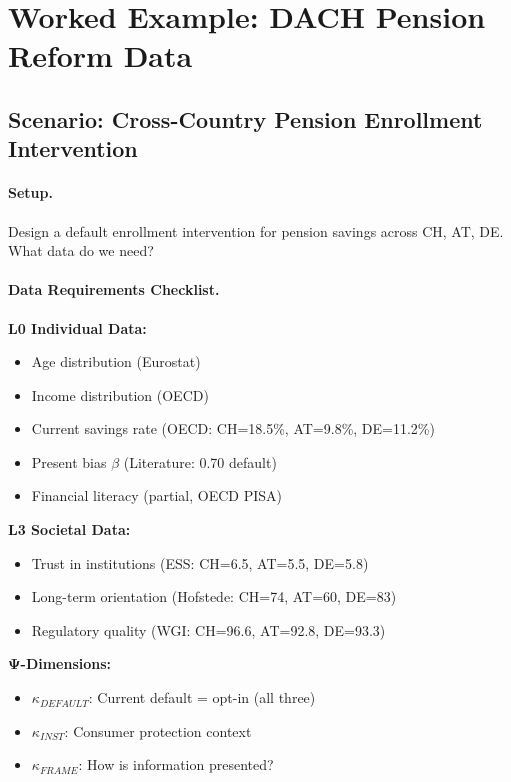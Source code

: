 \section{Worked Example: DACH Pension Reform Data}
\label{sec:dr-example}

\subsection{Scenario: Cross-Country Pension Enrollment Intervention}

\paragraph{Setup.} Design a default enrollment intervention for pension savings across CH, AT, DE. What data do we need?

\paragraph{Data Requirements Checklist.}

\begin{tcolorbox}[colback=green!5!white, colframe=green!75!black,
    title=Data Checklist: Pension Intervention]

\textbf{L0 Individual Data:}
\begin{itemize}[nosep]
\item[\checkmark] Age distribution (Eurostat)
\item[\checkmark] Income distribution (OECD)
\item[\checkmark] Current savings rate (OECD: CH=18.5\%, AT=9.8\%, DE=11.2\%)
\item[\checkmark] Present bias $\beta$ (Literature: 0.70 default)
\item[$\sim$] Financial literacy (partial, OECD PISA)
\end{itemize}

\textbf{L3 Societal Data:}
\begin{itemize}[nosep]
\item[\checkmark] Trust in institutions (ESS: CH=6.5, AT=5.5, DE=5.8)
\item[\checkmark] Long-term orientation (Hofstede: CH=74, AT=60, DE=83)
\item[\checkmark] Regulatory quality (WGI: CH=96.6, AT=92.8, DE=93.3)
\end{itemize}

\textbf{Ψ-Dimensions:}
\begin{itemize}[nosep]
\item[\checkmark] $\kappa_{DEFAULT}$: Current default = opt-in (all three)
\item[\checkmark] $\kappa_{INST}$: Consumer protection context
\item[$\sim$] $\kappa_{FRAME}$: How is information presented?
\end{itemize}

\end{tcolorbox}

